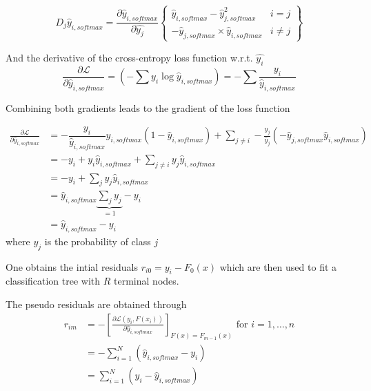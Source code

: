 \documentclass[12pt,a4paper,onecolumn,oneside,draft=on]{article}
\begin{document}
\begin{equation}
D_{j} \hat{y}_{i,softmax}=\dfrac{\partial \hat{y}_{i,softmax}}{\partial \hat{y_j}}\left\{\begin{array}{cc}
\hat{y}_{i,softmax}-\hat{y}_{j,softmax}^2 & i=j \\
-\hat{y}_{j,softmax} \times \hat{y}_{i,softmax} & i \neq j
\end{array}\right\}
\end{equation}

And the derivative of the cross-entropy loss function w.r.t. $\hat{y_i}$
\begin{equation}
\frac{\partial \mathcal{L}}{\partial\hat{y}_{i,softmax}}=\left(-\sum y_{i} \log \hat{y}_{i,softmax}\right)=-\sum\frac{y_{i}}{\hat{y}_{i,softmax}}
\end{equation}

Combining both gradients leads to the gradient of the loss function

\begin{equation}
\begin{aligned}
\frac{\partial \mathcal{L}}{\partial \hat{y}_{i,softmax}} &=-\dfrac{y_{i}}{\hat{y}_{i,softmax}} \hat{y}_{i,softmax}\left(1-\hat{y}_{i,softmax}\right)+\sum_{j \neq i}-\frac{y_{j}}{\hat{y}_{j}}\left(-\hat{y}_{j,softmax} \hat{y}_{i,softmax}\right)\\
&=-y_{i}+y_{i} \hat{y}_{i,softmax}+\sum_{j \neq i} y_{j} \hat{y}_{i,softmax} \\
&=-y_{i}+\sum_{j} y_{j} \hat{y}_{i,softmax}\\
& =\hat{y}_{i,softmax} \underbrace{\sum_{j} y_{j}}_{=1}-y_{i}\\
& = \hat{y}_{i,softmax} - y_i
\end{aligned}
\end{equation} where $y_j$ is the probability of class $j$






One obtains the intial residuals $r_{i0}=y_i - F_0(x)$ which are then used to fit a classification tree with $R$ terminal nodes.

The pseudo residuals are obtained through
\begin{equation}
\begin{aligned}
r_{im} &= -\left[\frac{\partial \mathcal{L}\left(y_{i}, F\left(x_{i}\right)\right)}{\partial \hat{y}_{i,softmax}}\right]_{F(x)=F_{m-1}(x)} \text { for } i=1, \ldots, n \\
&= -\sum_{i = 1}^N(\hat{y}_{i,softmax} - y_i) \\
&= \sum_{i = 1}^N (y_i -\hat{y}_{i,softmax})
\end{aligned}
\end{equation}
\end{document}
